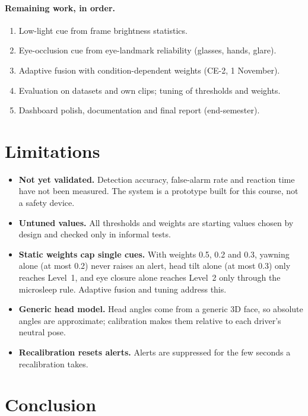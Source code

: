 \documentclass[12pt,a4paper]{article}
\begin{document}
\paragraph{Remaining work, in order.}
\begin{enumerate}
\item Low-light cue from frame brightness statistics.
\item Eye-occlusion cue from eye-landmark reliability (glasses, hands, glare).
\item Adaptive fusion with condition-dependent weights (CE-2, 1 November).
\item Evaluation on datasets and own clips; tuning of thresholds and weights.
\item Dashboard polish, documentation and final report (end-semester).
\end{enumerate}

\section{Limitations}

\begin{itemize}
\item \textbf{Not yet validated.} Detection accuracy, false-alarm rate and reaction time have not been measured. The system is a prototype built for this course, not a safety device.
\item \textbf{Untuned values.} All thresholds and weights are starting values chosen by design and checked only in informal tests.
\item \textbf{Static weights cap single cues.} With weights 0.5, 0.2 and 0.3, yawning alone (at most 0.2) never raises an alert, head tilt alone (at most 0.3) only reaches Level~1, and eye closure alone reaches Level~2 only through the microsleep rule. Adaptive fusion and tuning address this.
\item \textbf{Generic head model.} Head angles come from a generic 3D face, so absolute angles are approximate; calibration makes them relative to each driver's neutral pose.
\item \textbf{Recalibration resets alerts.} Alerts are suppressed for the few seconds a recalibration takes.
\end{itemize}

\section{Conclusion}
\end{document}
